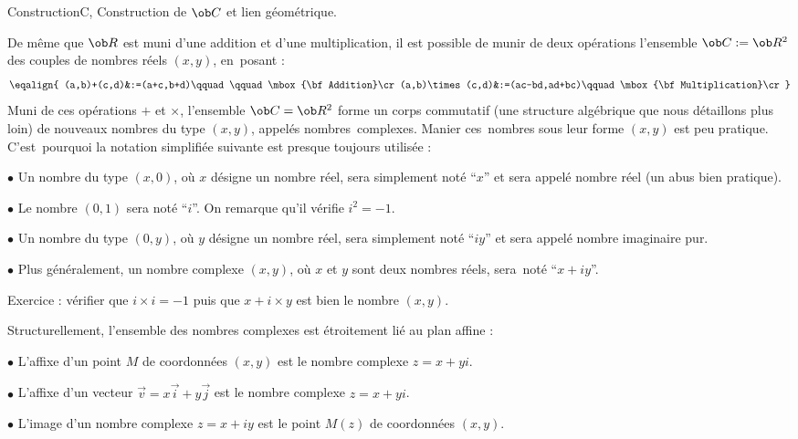 \Subsection ConstructionC, Construction de $\ob C$ et lien géométrique. 

De même que $\ob R$ est muni d'une addition et d'une multiplication, 
il est possible de munir de deux opérations l'ensemble $\ob C:=\ob R^2$ des couples de nombres réels $(x,y)$, 
en~posant : 
$$
\eqalign{
(a,b)+(c,d)&:=(a+c,b+d)\qquad\qquad\mbox{\bf Addition}\cr
(a,b)\times(c,d)&:=(ac-bd,ad+bc)\qquad\mbox{\bf Multiplication}\cr
}%
$$
Muni de ces opérations $+$ et $\times$, l'ensemble $\ob C=\ob R^2$ forme un corps commutatif 
(une structure algébrique que nous détaillons plus loin) de nouveaux nombres du type $(x,y)$, appelés nombres~complexes. 
Manier ces~nombres sous leur forme $(x,y)$ est peu pratique. 
C'est~pourquoi la notation simplifiée suivante est presque toujours utilisée : 
\medskip
\item{$\bullet$}
Un nombre du type $(x,0)$, où $x$ désigne un nombre réel, sera simplement noté ``$x$'' et sera appelé nombre réel (un abus bien pratique).
\medskip
\item{$\bullet$} 
Le nombre $(0,1)$ sera noté ``$i$''. On remarque qu'il vérifie $i^2=-1$. 
\medskip
\item{$\bullet$} 
Un nombre du type $(0,y)$, où $y$ désigne un nombre réel, sera simplement noté ``$iy$'' et sera appelé nombre imaginaire pur. 
\medskip
\item{$\bullet$}
Plus généralement, un nombre complexe $(x,y)$, où $x$ et $y$ sont deux nombres réels, sera~noté ``$x+iy$''. 
\bigskip

\noindent
Exercice : vérifier que $i\times i=-1$ puis que $x+i\times y$ est bien le nombre $(x,y)$. 
\bigskip

Structurellement, l'ensemble des nombres complexes est étroitement lié au plan affine : 
\bigskip
{} 
\item{$\bullet$} L'affixe d'un point $M$ de coordonnées $(x,y)$ est le nombre complexe $z=x+yi$. 
\item{$\bullet$} L'affixe d'un vecteur $\vec v=x\vec i+y\vec j$ est le nombre complexe $z=x+yi$. 
\item{$\bullet$} L'image d'un nombre complexe $z=x+iy$ est le point $M(z)$ de coordonnées $(x,y)$. 


